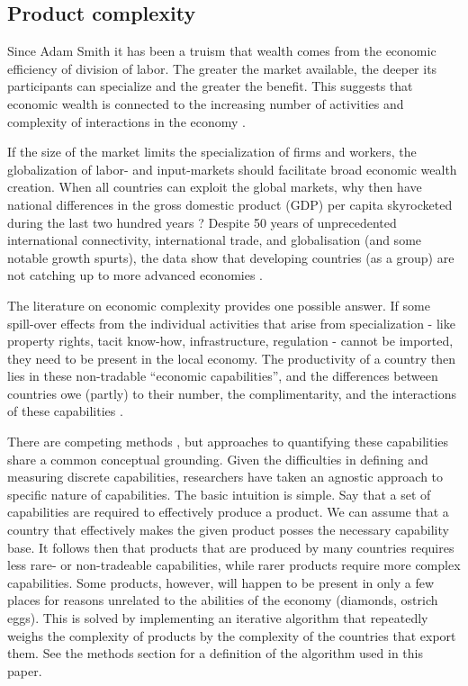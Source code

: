 \documentclass[11pt]{article}
\begin{document}
\subsection{Product complexity}
\label{sec:frame-product-complexity}

Since Adam Smith it has been a truism that wealth comes from the economic efficiency of division of labor. The greater the market available, the deeper its participants can specialize and the greater the benefit. This suggests that economic wealth is connected to the increasing number of activities and complexity of interactions in the economy \citep{romer_endogenous_1990}.

If the size of the market limits the specialization of firms and workers, the globalization of labor- and input-markets should facilitate broad economic wealth creation. When all countries can exploit the global markets, why then have national differences in the gross domestic product (GDP) per capita skyrocketed during the last two hundred years \citep{pritchett_divergence_1997}? Despite 50 years of unprecedented international connectivity, international trade, and globalisation (and some notable growth spurts), the data show that developing countries (as a group) are not catching up to more advanced economies \citep{johnson_what_2020}.

The literature on economic complexity provides one possible answer. If some spill-over effects from the individual activities that arise from  specialization - like property rights, tacit know-how, infrastructure, regulation - cannot be imported, they need to be present in the local economy. The productivity of a country then lies in these non-tradable ``economic capabilities'', and the differences between countries owe (partly) to their number, the complimentarity, and the interactions of these capabilities \citep{hidalgo_product_2007,hausmann_atlas_2013}.

There are competing methods \citep{tacchella_new_2012,hidalgo_building_2009,inoua_simple_2016}, but approaches to quantifying these capabilities share a common conceptual grounding. Given the difficulties in defining and measuring discrete capabilities, researchers have taken an agnostic approach to specific nature of capabilities. The basic intuition is simple. Say that a set of capabilities are required to effectively produce a product. We can assume that a country that effectively makes the given product posses the necessary capability base. It follows then that products that are produced by many countries requires less rare- or non-tradeable capabilities, while rarer products require more complex capabilities. Some products, however, will happen to be present in only a few places for reasons unrelated to the abilities of the economy (diamonds, ostrich eggs). This is solved by implementing an iterative algorithm that repeatedly weighs the complexity of products by the complexity of the countries that export them. See the methods section for a definition of the algorithm used in this paper.
\end{document}
